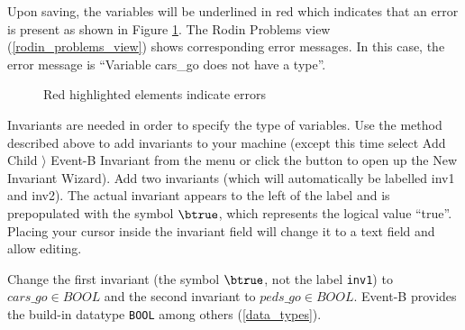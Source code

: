 Upon saving, the variables will be underlined in red which indicates that an error is present as shown in Figure \ref{fig_tut_03_error}.  The \textsf{Rodin Problems} view (\ref{rodin_problems_view}) shows corresponding error messages. In this case, the error message is ``Variable cars\_go does not have a type''.

\begin{figure}[!ht]
\begin{center}
	\caption{Red highlighted elements indicate errors}
	\label{fig_tut_03_error}
\end{center}
\end{figure}

Invariants are needed in order to specify the type of variables. Use the method described above to add invariants to your machine (except this time select \textsf{Add Child $\rangle$ Event-B Invariant} from the menu or click the  button to open up the New Invariant Wizard). Add two invariants (which will automatically be labelled \textsf{inv1} and \textsf{inv2}). The actual invariant appears to the left of the label and is prepopulated with the symbol $\btrue$, which represents the logical value ``true''. Placing your cursor inside the invariant field will change it to a text field and allow editing. 

Change the first invariant (the symbol $\btrue$, not the label \texttt{inv1}) to $cars\_go \in  BOOL$ and the second invariant to $peds\_go \in  BOOL$.
Event-B provides the build-in datatype \texttt{BOOL} among others (\ref{data_types}).



